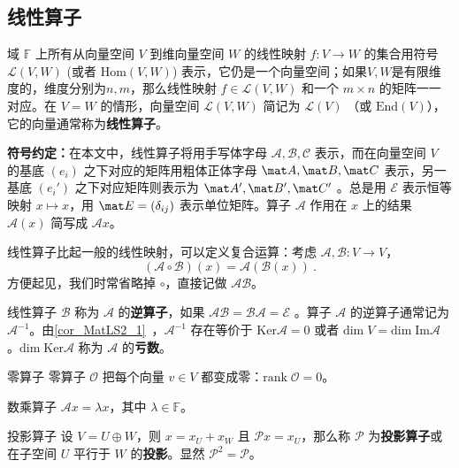 
\begin{issues}
\issueTODO
\end{issues}


\subsection{线性算子}\label{sub_LiOper_4}

域 $\mathbb{F}$ 上所有从向量空间 $V$ 到维向量空间 $W$ 的线性映射 $f:V\rightarrow W$ 的集合用符号 $\mathcal{L}(V, W)$ (或者 $\mathrm{Hom}(V, W)$) 表示，它仍是一个向量空间；如果$V, W$是有限维度的，维度分别为$n, m$，那么线性映射 $f \in \mathcal{L}(V, W)$ 和一个 $m\times n$ 的矩阵一一对应。在 $V=W$ 的情形，向量空间 $\mathcal{L}(V, W)$ 简记为 $\mathcal{L}(V)$ （或 $\mathrm{End}(V)$），它的向量通常称为\textbf{线性算子}。

\textbf{符号约定：}在本文中，线性算子将用手写体字母 $\mathcal{A,B,C}$ 表示，而在向量空间 $V$ 的基底 $(e_i)$ 之下对应的矩阵用粗体正体字母 $\mat A,\mat B,\mat C$ 表示，另一基底 $(e_i')$ 之下对应矩阵则表示为 $\mat A',\mat B',\mat C'$ 。总是用 $\mathcal{E}$ 表示恒等映射 $x \mapsto  x$，用 $\mat E = (\delta_{ij})$ 表示单位矩阵。算子 $\mathcal{A}$ 作用在 $ x$ 上的结果 $\mathcal{A}(x)$ 简写成 $\mathcal{A} x$。

线性算子比起一般的线性映射，可以定义复合运算：考虑 $\mathcal{A}, \mathcal{B}: V \to V$，
\begin{equation}
(\mathcal{A} \circ \mathcal{B})(x) = \mathcal{A} (\mathcal{B}(x))~.
\end{equation}
方便起见，我们时常省略掉 $\circ$，直接记做 $\mathcal{A} \mathcal{B}$。

线性算子 $\mathcal{B}$ 称为 $\mathcal{A}$ 的\textbf{逆算子}，如果 $\mathcal{AB}=\mathcal{BA}=\mathcal{E}$ 。算子 $\mathcal{A}$ 的逆算子通常记为 $\mathcal{A}^{-1}$。由\autoref{cor_MatLS2_1}~，$\mathcal{A}^{-1}$ 存在等价于 $\mathrm{Ker}\mathcal{A}=0$ 或者 $\mathrm{dim}\;V=\mathrm{dim\;Im}\mathcal{A}$ 。$\mathrm{dim\;Ker}\mathcal{A}$ 称为 $\mathcal{A}$ 的\textbf{亏数}。
\begin{example}{零算子}\label{ex_LiOper_1}
零算子 $\mathcal{O}$ 把每个向量 $ v\in V$ 都变成零：$\mathrm{rank}\; \mathcal{O}=0$。
\end{example}
\begin{example}{数乘算子}
$\mathcal{A} x=\lambda x$，其中 $\lambda\in\mathbb{F}$。
\end{example}
\begin{example}{投影算子}
设 $V=U\oplus W$，则 $ x= x_U+ x_W$ 且 $\mathcal{P} x= x_U$，那么称 $\mathcal{P}$ 为\textbf{投影算子}或在子空间 $U$ 平行于 $W$ 的\textbf{投影}。显然 $\mathcal{P}^2=\mathcal{P}$。
\end{example}

